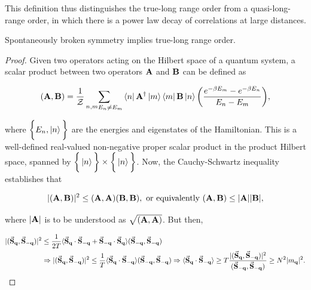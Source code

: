 \documentclass{homework}
\begin{document}
This definition thus distinguishes the true-long range order from a quasi-long-range order, in which there is a power law decay of correlations at large distances. 

\begin{tcolorbox}[colback=yellow!10!white,colframe=red!75!black,lowerbox=invisible, title = Spontaneously broken symmetry and true-long range order]

\label{MW_Broken_Symm_and_Long_range_order}

Spontaneously broken symmetry implies true-long range order.

\end{tcolorbox}

\begin{proof}
Given two operators acting on the Hilbert space of a quantum system, a scalar product between two operators ${\bf A}$ and ${\bf B}$ can be defined as 

$$
    ( {\bf A}, {\bf B} ) = \frac{1}{\mathcal{Z}} \sum_{\substack{{n,m}} \\
                    E_n \neq E_m} \bra{n}{{\bf A}}^\dagger \ket{m}
                    \bra{m} {{\bf B}} \ket{n} \bigg( \frac{e^{-\beta E_m} - e^{-\beta E_n}}{E_n - E_m} \bigg),
$$

where $\bigg\{E_n, \ket{n}\bigg\}$ are the energies and eigenstates of the Hamiltonian. This is a well-defined real-valued non-negative proper scalar product in the product Hilbert space, spanned by $\bigg\{\ket{n}\bigg\} \times \bigg\{\ket{n}\bigg\}$. Now, the Cauchy-Schwartz inequality establishes that 

$$
    |({\bf A}, {\bf B})|^2 \leq ({\bf A}, {\bf A}) ({\bf B}, {\bf B}), \textnormal{ or equivalently }
    ({\bf A}, {\bf B}) \leq |{\bf A}| |{\bf B}|,
$$

where $|{\bf A}|$ is to be understood as $\sqrt{({\bf A},{\bf A})}$. But then, 

\begin{equation}
    \begin{split}
        |(\vec{{\bf S}}_{{\bf q}}, \vec{{\bf S}}_{-{\bf q}})|^2 &\leq \frac{1}{2T} \langle \vec{{\bf S}}_{{\bf q}} \cdot  \vec{{\bf S}}_{-{\bf q}} + \vec{{\bf S}}_{-{\bf q}} \cdot  \vec{{\bf S}}_{{\bf q}} \rangle (\vec{{\bf S}}_{-{\bf q}}, \vec{{\bf S}}_{-{\bf q}}) \\
        & \Rightarrow|(\vec{{\bf S}}_{{\bf q}}, \vec{{\bf S}}_{-{\bf q}})|^2 \leq \frac{1}{T} \langle \vec{{\bf S}}_{{\bf q}} \cdot \vec{{\bf S}}_{-{\bf q}} \rangle (\vec{{\bf S}}_{-{\bf q}}, \vec{{\bf S}}_{-{\bf q}}) \Rightarrow \langle \vec{{\bf S}}_{{\bf q}} \cdot \vec{{\bf S}}_{-{\bf q}} \rangle \geq T \frac{|(\vec{{\bf S}}_{{\bf q}}, \vec{{\bf S}}_{-{\bf q}})|^2}{(\vec{{\bf S}}_{-{\bf q}}, \vec{{\bf S}}_{-{\bf q}})} \geq N^2 |m_{\bf q}|^2. 
    \end{split}
\end{equation}


\end{proof}
\end{document}
